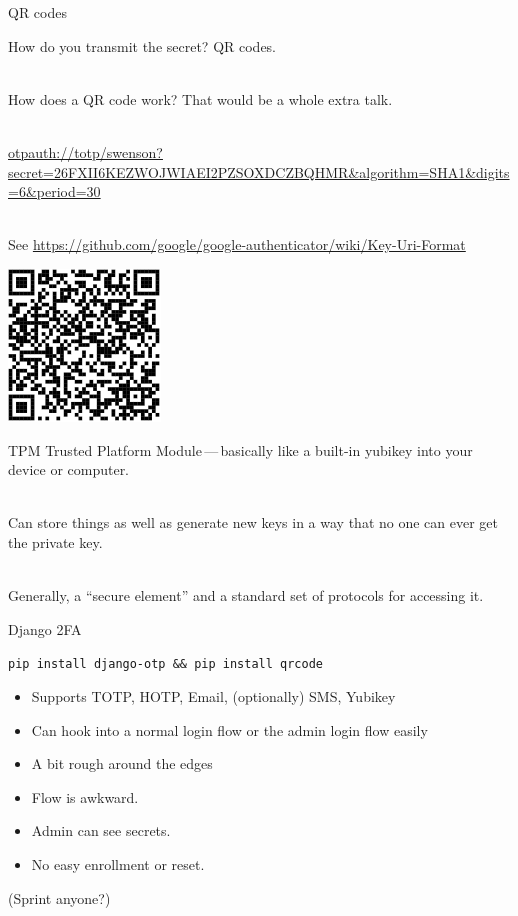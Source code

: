 \documentclass{beamer}
\begin{document}
\begin{frame}{QR codes}

How do you transmit the secret? QR codes.

\ \\

How does a QR code work? That would be a whole extra talk.

\ \\

\url{otpauth://totp/swenson?secret=26FXII6KEZWOJWIAEI2PZSOXDCZBQHMR&algorithm=SHA1&digits=6&period=30}

\ \\

See \url{https://github.com/google/google-authenticator/wiki/Key-Uri-Format}

\begin{center}
  \includegraphics{qrcode.png}
\end{center}

\end{frame}

\begin{frame}{TPM}
Trusted Platform Module\,---\,basically like a built-in yubikey into your device or computer.

\ \\

Can store things as well as generate new keys in a way that no one can ever get the private key.

\ \\

Generally, a ``secure element'' and a standard set of protocols for accessing it.

\end{frame}

\begin{frame}{Django 2FA}

\texttt{pip install django-otp \&\& pip install qrcode}

\begin{itemize}
  \item Supports TOTP, HOTP, Email, (optionally) SMS, Yubikey
  \item Can hook into a normal login flow or the admin login flow easily
  \item A bit rough around the edges
  \item Flow is awkward.
  \item Admin can see secrets.
  \item No easy enrollment or reset.
\end{itemize}

(Sprint anyone?)

\end{frame}
\end{document}
